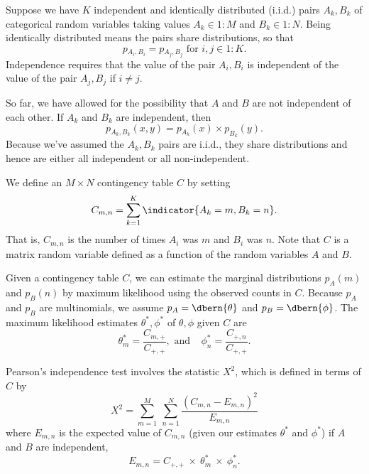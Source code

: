 Suppose we have $K$ independent and identically distributed (i.i.d.)
pairs $A_k, B_k$ of categorical random variables taking values $A_k
\in 1{:}M$ and $B_k \in 1{:}N$.  Being identically distributed means
the pairs share distributions, so that
%
\begin{equation}
p\!_{A_i,B_i} = p\!_{A_j,B_j} \mbox{ for } i, j \in 1{:}K.
\end{equation}
%
Independence requires that the value of the pair $A_i,B_i$ is
independent of the value of the pair $A_j,B_j$ if $i \neq j$.

So far, we have allowed for the possibility that $A$ and $B$ are not
independent of each other.  If $A_k$ and $B_k$ are independent, then
%
\begin{equation}
p\!_{A_k,B_k}(x,y) = p\!_{A_k}(x) \times p_{B_k}(y).
\end{equation}
%
Because we've assumed the $A_k,B_k$ pairs are i.i.d., they share
distributions and hence are either all independent or all
non-independent.

We define an $M \times N$ contingency table $C$ by setting
%
\begin{equation}
C_{m,n} = \sum_{k=1}^K \indicator{A_k = m, B_k = n}.
\end{equation}
%
That is, $C_{m,n}$ is the number of times $A_i$ was $m$ and $B_i$ was
$n$.  Note that $C$ is a matrix random variable defined as a function
of the random variables $A$ and $B$.

Given a contingency table $C$, we can estimate the marginal
distributions $p_A(m)$ and $p_B(n)$ by maximum likelihood using the
observed counts in $C$.  Because $p_A$ and $p_B$ are multinomials, we
assume $p_A = \dbern{\theta}$ and $p_B = \dbern{\phi}$.  The
maximum likelihood estimates $\theta^*, \phi^*$ of $\theta,\phi$
given $C$ are
%
\begin{equation}
\theta^*_m = \frac{C_{m,+}}{C_{+,+}}, \mbox{ and}
\ \ \ \ \
\phi^*_n = \frac{C_{+,n}}{C_{+,+}}.
\end{equation}

Pearson's independence test involves the statistic $X^2$, which is
defined in terms of $C$ by
%
\begin{equation}
X^2 
= \sum_{m=1}^M \ \sum_{n=1}^N 
  \frac{(C_{m,n} - E_{m,n})^2}
       {E_{m,n}}
\end{equation}
%
where $E_{m,n}$ is the expected value of $C_{m,n}$ (given our
estimates $\theta^*$ and $\phi^*$) if $A$ and $B$ are independent,
%
\begin{equation}
E_{m,n} = C_{+,+} \ \times \ \theta^*_m \ \times \ \phi^*_n.
\end{equation}

